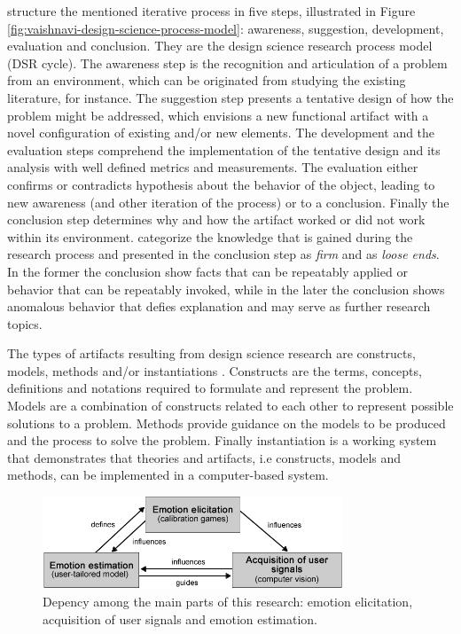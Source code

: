 \textcite{vaishnavi2015design} structure the mentioned iterative process in five steps, illustrated in Figure \ref{fig:vaishnavi-design-science-process-model}: awareness, suggestion, development, evaluation and conclusion. They are the design science research process model (DSR cycle). The awareness step is the recognition and articulation of a problem from an environment, which can be originated from studying the existing literature, for instance. The suggestion step presents a tentative design of how the problem might be addressed, which envisions a new functional artifact with a novel configuration of existing and/or new elements. The development and the evaluation steps comprehend the implementation of the tentative design and its analysis with well defined metrics and measurements. The evaluation either confirms or contradicts hypothesis about the behavior of the object, leading to new awareness (and other iteration of the process) or to a conclusion. Finally the conclusion step determines why and how the artifact worked or did not work within its environment. \textcite{vaishnavi2015design} categorize the knowledge that is gained during the research process and presented in the conclusion step as \textit{firm} and as \textit{loose ends}. In the former the conclusion show facts that can be repeatably applied or behavior that can be repeatably invoked, while in the later the conclusion shows anomalous behavior that defies explanation and may serve as further research topics.

The types of artifacts resulting from design science research are constructs, models, methods and/or instantiations \parencite{oates2005researching,johannesson2014introduction}. Constructs are the terms, concepts, definitions and notations required to formulate and represent the problem. Models are a combination of constructs related to each other to represent possible solutions to a problem. Methods provide guidance on the models to be produced and the process to solve the problem. Finally instantiation is a working system that demonstrates that theories and artifacts, i.e constructs, models and methods, can be implemented in a computer-based system.

\begin{figure}[h]
    \centering
    \includegraphics[width=0.8\textwidth]{Content/figures/method-components-dependency.png}
    \caption{Depency among the main parts of this research: emotion elicitation, acquisition of user signals and emotion estimation.}
    \label{fig:method-components-dependency}
\end{figure}

